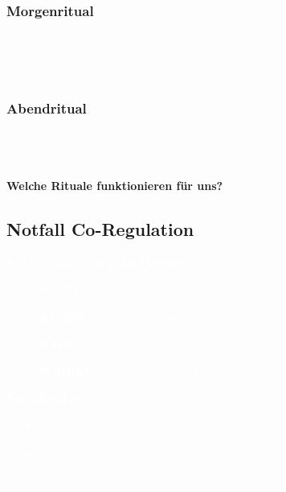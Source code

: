\begin{ctmmOrangeBox}[title=Tägliche Verbindungsrituale]

\subsubsection{Morgenritual}
\\
\\
\\

\subsubsection{Abendritual}  
\\
\\
\\

\textbf{Welche Rituale funktionieren für uns?} \\

\end{ctmmOrangeBox}

\subsection{Notfall Co-Regulation}

\begin{ctmmRedBox}[title=\textcolor{white}{Akute Regulationshilfe}]

\textcolor{white}{\textbf{Bei Überforderung des Partners:}}

\begin{enumerate}
    \item[\textcolor{white}{1.}] \textcolor{white}{\textbf{STOPP} - Eigene Reaktion regulieren}
    \item[\textcolor{white}{2.}] \textcolor{white}{\textbf{ATMEN} - Ruhige, tiefe Atmung vorleben}
    \item[\textcolor{white}{3.}] \textcolor{white}{\textbf{NÄHE} - Körperliche Präsenz anbieten}
    \item[\textcolor{white}{4.}] \textcolor{white}{\textbf{FÜHREN} - Ruhige Stimme, klare Anweisungen}
\end{enumerate}

\textcolor{white}{\textbf{Notfall-Sätze:}}
\begin{itemize}
    \item[\textcolor{white}{•}] \textcolor{white}{„Atme mit mir zusammen"}
    \item[\textcolor{white}{•}] \textcolor{white}{„Du bist sicher, ich bin hier"}
    \item[\textcolor{white}{•}] \textcolor{white}{„Wir schaffen das zusammen"}
\end{itemize}

\end{ctmmRedBox}

